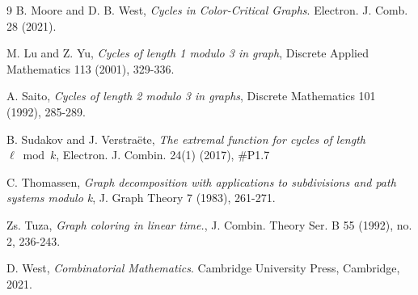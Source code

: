 \documentclass[12pt]{article}
\numberwithin{theorem}{section}
\begin{document}
\begin{thebibliography}{9}
B. Moore and D. B. West, \emph{Cycles in Color-Critical Graphs}. {Electron. J. Comb.} 28 (2021).

 M. Lu and Z. Yu, {\em Cycles of length 1 modulo 3 in graph}, Discrete Applied Mathematics 113 (2001),
329-336.

 A. Saito, {\em Cycles of length 2 modulo 3 in graphs}, Discrete Mathematics 101 (1992), 285-289.


B. Sudakov and J. Verstra\"{e}te, \emph{The extremal function for cycles of length $\ell\bmod k$}, {Electron. J. Combin.} 24(1) (2017), \#P1.7

C. Thomassen, \emph{Graph decomposition with applications to subdivisions and path systems modulo k}, {J. Graph Theory} 7 (1983), 261-271.

Zs. Tuza, \emph{Graph coloring in linear time.}, {J. Combin. Theory Ser. B} 55 (1992), no. 2, 236-243.

D. West, \emph{Combinatorial Mathematics}. Cambridge University Press, Cambridge, 2021.

\end{thebibliography}
\end{document}
